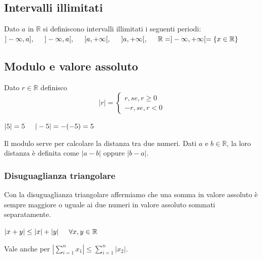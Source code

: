\subsection*{Intervalli illimitati}
Dato $a$ in $\mathbb{R}$ si definiscono intervalli illimitati i seguenti periodi:\\ $]-\infty,a],\hspace{0,5cm}]-\infty,a[,\hspace{0,5cm}[a,+\infty[,\hspace{0,5cm}]a,+\infty[,\hspace{0,5cm}\mathbb{R}=]-\infty,+\infty[=\{x\in\mathbb{R}\}$

\subsection*{Modulo e valore assoluto}
Dato $r\in\mathbb{R}$ definisco 
\begin{equation}
|r|=\begin{cases}
r, se, r\geq 0\\
-r, se, r<0
\end{cases}
\end{equation}

$|5|=5\hspace{0.5cm}|-5|=-(-5)=5$

Il modulo serve per calcolare la distanza tra due numeri. Dati $a$ e $b\in\mathbb{R}$, la loro distanza è definita come $|a-b|$ oppure $|b-a|$.
\subsubsection*{Disuguaglianza triangolare}
Con la disuguaglianza triangolare affermiamo che una somma in valore assoluto è sempre maggiore o uguale ai due numeri in valore assoluto sommati separatamente.
\begin{center}
    $|x+y|\leq |x|+|y|\hspace{0.5cm}\forall x,y\in\mathbb{R}$
\end{center}
Vale anche per $|\sum_{i=1}^{n}x_1|\leq\sum_{i=1}^{n}|x_2|$.

